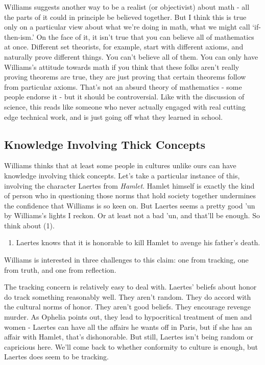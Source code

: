 \documentclass[
]{article}
\providecommand{\tightlist}{%
  \setlength{\itemsep}{0pt}\setlength{\parskip}{0pt}}
\begin{document}
Williams suggests another way to be a realist (or objectivist) about
math - all the parts of it could in principle be believed together. But
I think this is true only on a particular view about what we're doing in
math, what we might call `if-then-ism.' On the face of it, it isn't true
that you can believe all of mathematics at once. Different set
theorists, for example, start with different axioms, and naturally prove
different things. You can't believe all of them. You can only have
Williams's attitude towards math if you think that these folks aren't
really proving theorems are true, they are just proving that certain
theorems follow from particular axioms. That's not an absurd theory of
mathematics - some people endorse it - but it should be controversial.
Like with the discussion of science, this reads like someone who never
actually engaged with real cutting edge technical work, and is just
going off what they learned in school.

\hypertarget{knowledge-involving-thick-concepts}{%
\subsection{Knowledge Involving Thick
Concepts}\label{knowledge-involving-thick-concepts}}

Williams thinks that at least some people in cultures unlike ours can
have knowledge involving thick concepts. Let's take a particular
instance of this, involving the character Laertes from \emph{Hamlet}.
Hamlet himself is exactly the kind of person who in questioning those
norms that hold society together undermines the confidence that Williams
is so keen on. But Laertes seems a pretty good 'un by Williams's lights
I reckon. Or at least not a bad 'un, and that'll be enough. So think
about (1).

\begin{enumerate}
\def\labelenumi{\arabic{enumi}.}
\tightlist
\item
  Laertes knows that it is honorable to kill Hamlet to avenge his
  father's death.
\end{enumerate}

Williams is interested in three challenges to this claim: one from
tracking, one from truth, and one from reflection.

The tracking concern is relatively easy to deal with. Laertes' beliefs
about honor do track something reasonably well. They aren't random. They
do accord with the cultural norms of honor. They aren't good beliefs.
They encourage revenge murder. As Ophelia points out, they lead to
hypocritical treatment of men and women - Laertes can have all the
affairs he wants off in Paris, but if she has an affair with Hamlet,
that's dishonorable. But still, Laertes isn't being random or capricious
here. We'll come back to whether conformity to culture is enough, but
Laertes does seem to be tracking.
\end{document}
